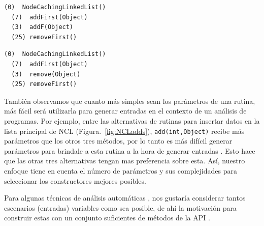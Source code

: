 \begin{lstlisting}[numbers=none,label=fig:NCLnoMin, frame=tb , basicstyle=\scriptsize]
  (0)  NodeCachingLinkedList()
  (7)  addFirst(Object)
  (3)  addF(Object)
  (25) removeFirst()
\end{lstlisting}

\begin{lstlisting}[numbers=none,label=fig:NCLnoMin1, caption= Conjuntos de metodos builders suficientes pero no mínimos, captionpos=b, frame=tb , basicstyle=\scriptsize]
  (0)  NodeCachingLinkedList()
  (7)  addFirst(Object)
  (3)  remove(Object)
  (25) removeFirst()
\end{lstlisting}

También observamos que cuanto más simples sean los parámetros de una rutina, más
fácil será utilizarla para generar entradas en el contexto de un análisis de
programas. Por ejemplo, entre las alternativas de rutinas para insertar datos en
la lista principal de NCL (Figura.~\ref{fig:NCLadds}), \texttt{add(int,Object)}
recibe más parámetros que los otros tres métodos, por lo tanto es más difícil generar parámetros para brindale a esta rutina a la hora de generar entradas . Esto hace que las otras tres alternativas tengan mas preferencia sobre esta. Así, nuestro enfoque tiene en cuenta el número de parámetros y sus complejidades para seleccionar los constructores mejores posibles.

Para algunas técnicas de análisis automáticas , nos gustaría considerar tantos escenarios (entradas) variables como sea posible, de ahí la motivación para construir estas con un conjunto suficientes de métodos de la API 
.


